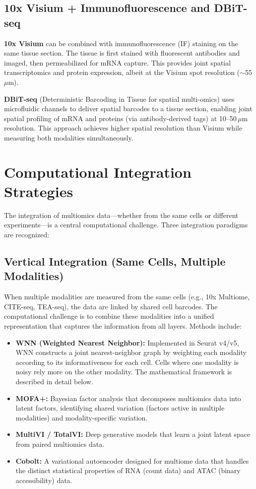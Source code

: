 \subsection{10x Visium + Immunofluorescence and DBiT-seq}
\label{subsec:multiomics:visium-dbit}

\textbf{10x Visium} can be combined with immunofluorescence (IF) staining on the same tissue section. The tissue is first stained with fluorescent antibodies and imaged, then permeabilized for mRNA capture. This provides joint spatial transcriptomics and protein expression, albeit at the Visium spot resolution ($\sim$55\,$\mu$m).

\textbf{DBiT-seq} (Deterministic Barcoding in Tissue for spatial multi-omics) uses microfluidic channels to deliver spatial barcodes to a tissue section, enabling joint spatial profiling of mRNA and proteins (via antibody-derived tags) at 10--50\,$\mu$m resolution. This approach achieves higher spatial resolution than Visium while measuring both modalities simultaneously.


\section{Computational Integration Strategies}
\label{sec:multiomics:integration}

The integration of multiomics data---whether from the same cells or different experiments---is a central computational challenge. Three integration paradigms are recognized:

\subsection{Vertical Integration (Same Cells, Multiple Modalities)}
\label{subsec:multiomics:vertical}

When multiple modalities are measured from the same cells (e.g., 10x Multiome, CITE-seq, TEA-seq), the data are linked by shared cell barcodes. The computational challenge is to combine these modalities into a unified representation that captures the information from all layers. Methods include:

\begin{itemize}[itemsep=2pt]
  \item \textbf{WNN (Weighted Nearest Neighbor):} Implemented in Seurat v4/v5, WNN constructs a joint nearest-neighbor graph by weighting each modality according to its informativeness for each cell. Cells where one modality is noisy rely more on the other modality. The mathematical framework is described in detail below.
  \item \textbf{MOFA+:} Bayesian factor analysis that decomposes multiomics data into latent factors, identifying shared variation (factors active in multiple modalities) and modality-specific variation.
  \item \textbf{MultiVI / TotalVI:} Deep generative models that learn a joint latent space from paired multiomics data.
  \item \textbf{Cobolt:} A variational autoencoder designed for multiome data that handles the distinct statistical properties of RNA (count data) and ATAC (binary accessibility) data.
\end{itemize}

